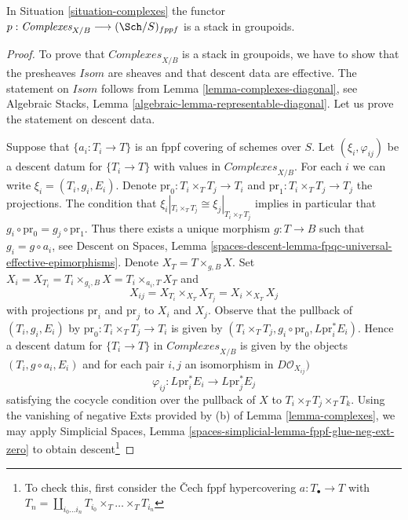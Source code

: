 \begin{lemma}
\label{lemma-complexes-stack}
In Situation \ref{situation-complexes} the functor
$p : \textit{Complexes}_{X/B} \longrightarrow (\Sch/S)_{fppf}$
is a stack in groupoids.
\end{lemma}

\begin{proof}
To prove that $\textit{Complexes}_{X/B}$ is a stack in groupoids,
we have to show that the presheaves $\mathit{Isom}$ are sheaves
and that descent data are effective. The statement on
$\mathit{Isom}$ follows from Lemma \ref{lemma-complexes-diagonal}, see
Algebraic Stacks, Lemma \ref{algebraic-lemma-representable-diagonal}.
Let us prove the statement on descent data.

\medskip\noindent
Suppose that $\{a_i : T_i \to T\}$ is an fppf covering of schemes over $S$.
Let $(\xi_i, \varphi_{ij})$ be a descent datum for $\{T_i \to T\}$
with values in $\textit{Complexes}_{X/B}$.
For each $i$ we can write $\xi_i = (T_i, g_i, E_i)$.
Denote $\text{pr}_0 : T_i \times_T T_j \to T_i$ and
$\text{pr}_1 : T_i \times_T T_j \to T_j$ the projections.
The condition that $\xi_i|_{T_i \times_T T_j} \cong \xi_j|_{T_i \times_T T_j}$
implies in particular that $g_i \circ \text{pr}_0 = g_j \circ \text{pr}_1$.
Thus there exists a unique morphism $g : T \to B$ such that
$g_i = g \circ a_i$, see
Descent on Spaces, Lemma
\ref{spaces-descent-lemma-fpqc-universal-effective-epimorphisms}.
Denote $X_T = T \times_{g, B} X$. Set
$X_i = X_{T_i} = T_i \times_{g_i, B} X = T_i \times_{a_i, T} X_T$
and
$$
X_{ij} = X_{T_i} \times_{X_T} X_{T_j} = X_i \times_{X_T} X_j
$$
with projections $\text{pr}_i$ and $\text{pr}_j$ to $X_i$ and $X_j$.
Observe that the pullback of $(T_i, g_i, E_i)$
by $\text{pr}_0 : T_i \times_T T_j \to T_i$ is given by
$(T_i \times_T T_j, g_i \circ \text{pr}_0, L\text{pr}_i^*E_i)$.
Hence a descent datum for $\{T_i \to T\}$ in $\textit{Complexes}_{X/B}$
is given by the objects $(T_i, g \circ a_i, E_i)$
and for each pair $i, j$ an isomorphism in
$D\mathcal{O}_{X_{ij}})$
$$
\varphi_{ij} :
L\text{pr}_i^*E_i \longrightarrow L\text{pr}_j^*E_j
$$
satisfying the cocycle condition over the pullback of $X$ to
$T_i \times_T T_j \times_T T_k$.
Using the vanishing of negative Exts provided by (b) of
Lemma \ref{lemma-complexes}, we may apply
Simplicial Spaces, Lemma \ref{spaces-simplicial-lemma-fppf-glue-neg-ext-zero}
to obtain descent\footnote{To check this, first consider the
{\v C}ech fppf hypercovering $a : T_\bullet \to T$ with
$T_n = \coprod_{i_0 \ldots i_n} T_{i_0} \times_T \ldots \times_T T_{i_n}$
}
\end{proof}

